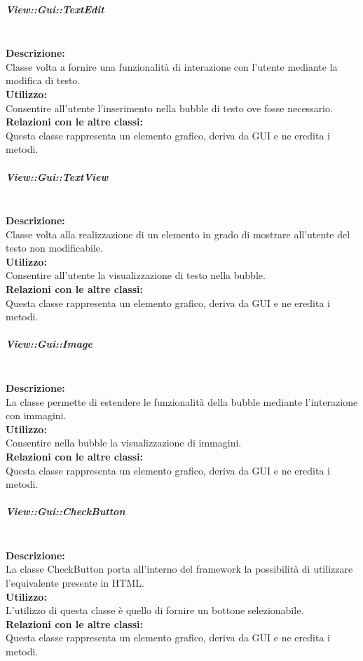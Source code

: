 \subparagraph{View\-::Gui\-::Text\-Edit}\label{gui-tedit}\mbox{}\\
\textbf{Descrizione:}\\
Classe volta a fornire una funzionalità di interazione con l'utente mediante la modifica di testo.\\
\textbf{Utilizzo:}\\
Consentire all'utente l'inserimento nella bubble di testo ove fosse necessario.\\
\textbf{Relazioni con le altre classi:}\\
Questa classe rappresenta un elemento grafico, deriva da GUI e ne eredita i metodi.

\subparagraph{View\-::Gui\-::Text\-View}\label{gui-tview}\mbox{}\\
\textbf{Descrizione:}\\
Classe volta alla realizzazione di un elemento in grado di mostrare all'utente del testo non modificabile.\\
\textbf{Utilizzo:}\\
Consentire all'utente la visualizzazione di testo nella bubble.\\
\textbf{Relazioni con le altre classi:}\\
Questa classe rappresenta un elemento grafico, deriva da GUI e ne eredita i metodi.

\subparagraph{View\-::Gui\-::Image}\label{gui-image}\mbox{}\\
\textbf{Descrizione:}\\
La classe permette di estendere le funzionalità della bubble mediante l'interazione con immagini.\\
\textbf{Utilizzo:}\\
Consentire nella bubble la visualizzazione di immagini.\\
\textbf{Relazioni con le altre classi:}\\
Questa classe rappresenta un elemento grafico, deriva da GUI e ne eredita i metodi.

\subparagraph{View\-::Gui\-::Check\-Button}\label{gui-check}\mbox{}\\
\textbf{Descrizione:}\\
La classe CheckButton porta all'interno del framework la possibilità di utilizzare l'equivalente presente in HTML.\\
\textbf{Utilizzo:}\\
L'utilizzo di questa classe è quello di fornire un bottone selezionabile.\\
\textbf{Relazioni con le altre classi:}\\
Questa classe rappresenta un elemento grafico, deriva da GUI e ne eredita i metodi.

